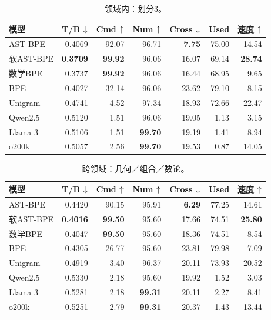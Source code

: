 \begin{table}[H]
\centering\small\renewcommand{\arraystretch}{1.05}
\caption{领域内：划分3。}\label{tab:detail3}
\begin{tabular}{lrrrrrr}\toprule
模型&T/B $\downarrow$&Cmd $\uparrow$&Num $\uparrow$&Cross $\downarrow$&Used&速度 $\uparrow$\\\midrule
AST-BPE & 0.4069 & 92.07 & 96.71 & \textbf{7.75} & 75.00 & 14.54 \\
软AST-BPE & \textbf{0.3709} & \textbf{99.92} & 96.06 & 16.07 & 69.14 & \textbf{28.74} \\
数学BPE & 0.3737 & \textbf{99.92} & 96.06 & 16.44 & 68.95 & 9.65 \\
BPE & 0.4027 & 32.14 & 96.06 & 23.62 & 79.10 & 8.15 \\
Unigram & 0.4741 & 4.52 & 97.34 & 18.93 & 72.66 & 22.47 \\
\midrule
Qwen2.5 & 0.5120 & 1.51 & 96.06 & 19.05 & 1.13 & 3.15 \\
Llama 3 & 0.5106 & 1.51 & \textbf{99.70} & 19.19 & 1.41 & 8.94 \\
o200k & 0.5057 & 2.56 & \textbf{99.70} & 19.53 & 0.87 & 14.05 \\
\bottomrule\end{tabular}
\end{table}

\begin{table}[H]
\centering\small\renewcommand{\arraystretch}{1.05}
\caption{跨领域：几何／组合／数论。}\label{tab:detail4}
\begin{tabular}{lrrrrrr}\toprule
模型&T/B $\downarrow$&Cmd $\uparrow$&Num $\uparrow$&Cross $\downarrow$&Used&速度 $\uparrow$\\\midrule
AST-BPE & 0.4420 & 90.15 & 95.91 & \textbf{6.29} & 77.25 & 14.61 \\
软AST-BPE & \textbf{0.4016} & \textbf{99.50} & 95.60 & 17.66 & 74.51 & \textbf{25.80} \\
数学BPE & 0.4047 & \textbf{99.50} & 95.60 & 18.36 & 74.51 & 8.54 \\
BPE & 0.4305 & 26.77 & 95.60 & 23.81 & 79.98 & 7.09 \\
Unigram & 0.4919 & 3.40 & 96.37 & 20.11 & 73.93 & 20.52 \\
\midrule
Qwen2.5 & 0.5330 & 2.18 & 95.60 & 19.92 & 1.52 & 3.03 \\
Llama 3 & 0.5281 & 2.18 & \textbf{99.31} & 20.11 & 2.27 & 8.41 \\
o200k & 0.5251 & 2.79 & \textbf{99.31} & 20.37 & 1.43 & 13.44 \\
\bottomrule\end{tabular}
\end{table}

